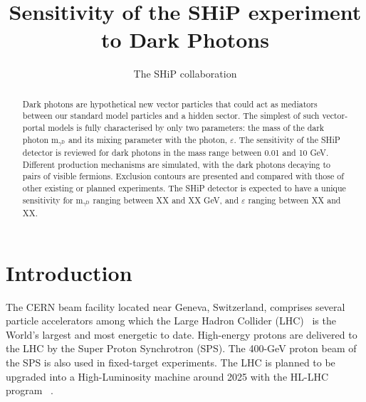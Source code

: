 \documentclass[12pt,a4paper]{article}
\begin{document}
\renewcommand{\thefootnote}{\fnsymbol{footnote}}
\setcounter{footnote}{1}

\title{Sensitivity of the SHiP experiment to Dark Photons}

\author{The SHiP collaboration}

\maketitle

\begin{abstract}

Dark photons are hypothetical new vector particles that could act as
mediators between our standard model particles and a hidden
sector. The simplest of such vector-portal models is fully
characterised by only two parameters: the mass of the dark photon
m$_{\gamma^{\mathrm{D}}}$ and its mixing parameter with the photon,
$\varepsilon$. The sensitivity of the SHiP detector is reviewed for
dark photons in the mass range between 0.01 and 10 GeV. Different
production mechanisms are simulated, with the dark photons decaying to
pairs of visible fermions. Exclusion contours are presented and
compared with those of other existing or planned experiments. The SHiP
detector is expected to have a unique sensitivity for
m$_{\gamma^{\mathrm{D}}}$ ranging between XX and XX GeV, and
$\varepsilon$ ranging between XX and XX.

\end{abstract}

\renewcommand{\thefootnote}{\arabic{footnote}}
\setcounter{footnote}{0}

\tableofcontents
\cleardoublepage

\pagestyle{plain} %
\setcounter{page}{1}

\section{Introduction}
\label{sec:intro}

The CERN beam facility located near Geneva, Switzerland, comprises
several particle accelerators among which the Large Hadron Collider
(LHC)~\cite{LHC} is the World's largest and most energetic to
date. High-energy protons are delivered to the LHC by the Super Proton
Synchrotron (SPS). The 400-GeV proton beam of the SPS is also used in
fixed-target experiments. The LHC is planned to be upgraded into a
High-Luminosity machine around 2025 with the HL-LHC program
~\cite{Apollinari:2015bam}.
\end{document}
